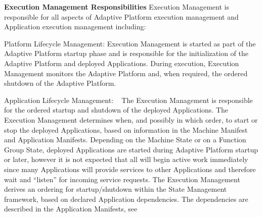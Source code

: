 \begin{DoxyItemize}
\item {\bfseries Execution Management Responsibilities} Execution Management is responsible for all aspects of Adaptive Platform execution management and Application execution management including\+:
\begin{DoxyItemize}
\item Platform Lifecycle Management\+: Execution Management is started as part of the Adaptive Platform startup phase and is responsible for the initialization of the Adaptive Platform and deployed Applications. During execution, Execution Management monitors the Adaptive Platform and, when required, the ordered shutdown of the Adaptive Platform.
\item Application Lifecycle Management\+: ~\newline
 The Execution Management is responsible for the ordered startup and shutdown of the deployed Applications. The Execution Management determines when, and possibly in which order, to start or stop the deployed Applications, based on information in the Machine Manifest and Application Manifests. Depending on the Machine State or on a Function Group State, deployed Applications are started during Adaptive Platform startup or later, however it is not expected that all will begin active work immediately since many Applications will provide services to other Applications and therefore wait and “listen” for incoming service requests. The Execution Management derives an ordering for startup/shutdown within the State Management framework, based on declared Application dependencies. The dependencies are described in the Application Manifests, see
\end{DoxyItemize}


\end{DoxyItemize}
